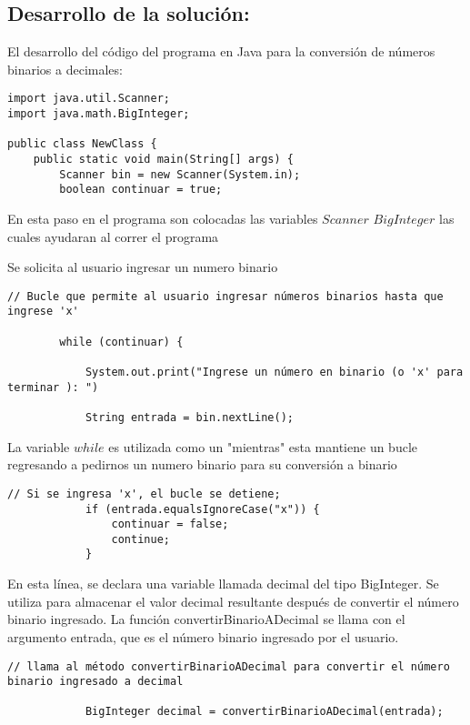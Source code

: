 \subsection{\textbf{Desarrollo de la solución:}}
El desarrollo del código del programa en Java para la conversión de números binarios a decimales:

\begin{lstlisting}[style=javaStyle]
import java.util.Scanner;
import java.math.BigInteger;

public class NewClass {
    public static void main(String[] args) {
        Scanner bin = new Scanner(System.in);
        boolean continuar = true;
\end{lstlisting}
En esta paso en el programa son colocadas las variables $Scanner$ $BigInteger$
las cuales ayudaran al correr el programa

Se solicita al usuario ingresar un numero binario
\begin{lstlisting}[style=javaStyle]
// Bucle que permite al usuario ingresar números binarios hasta que ingrese 'x'

        while (continuar) {
        
            System.out.print("Ingrese un número en binario (o 'x' para terminar ): ")
            
            String entrada = bin.nextLine();
\end{lstlisting}

 La variable $while$ es utilizada como un "mientras" esta mantiene un bucle regresando a pedirnos un numero binario para su conversión a binario

\begin{lstlisting}[style=javaStyle]
                 // Si se ingresa 'x', el bucle se detiene;
            if (entrada.equalsIgnoreCase("x")) {
                continuar = false;
                continue;
            }
\end{lstlisting}

En esta línea, se declara una variable llamada decimal del tipo BigInteger. Se utiliza para almacenar el valor decimal resultante después de convertir el número binario ingresado. La función convertirBinarioADecimal se llama con el argumento entrada, que es el número binario ingresado por el usuario.

\begin{lstlisting}[style=javaStyle]
 // llama al método convertirBinarioADecimal para convertir el número binario ingresado a decimal
 
            BigInteger decimal = convertirBinarioADecimal(entrada);
            
\end{lstlisting}

